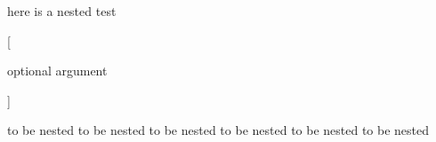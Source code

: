 here is a nested test
\begin{one}


	[

		optional argument

	]



	to be nested to be nested
	to be nested to be nested
	to be nested to be nested
\end{one}
